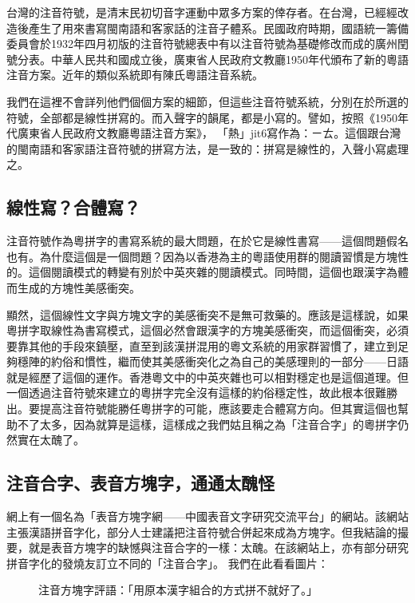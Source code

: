 \documentclass[a5paper, 12pt, openany]{book} %
\begin{document}
台灣的注音符號，是清末民初切音字運動中眾多方案的倖存者。在台灣，已經經改造後產生了用來書寫閩南語和客家話的注音子體系。民國政府時期，國語統一籌備委員會於1932年四月初版的注音符號總表中有以注音符號為基礎修改而成的廣州閏號分表。中華人民共和國成立後，廣東省人民政府文教廳1950年代頒布了新的粵語注音方案。近年的類似系統即有陳氏粵語注音系統。 

我們在這裡不會詳列他們個個方案的細節，但這些注音符號系統，分別在於所選的符號，全部都是線性拼寫的。而入聲字的韻尾，都是小寫的。譬如，按照《1950年代廣東省人民政府文教廳粵語注音方案》， 「熱」jit6寫作為：ㄧㄊ。這個跟台灣的閩南語和客家語注音符號的拼寫方法，是一致的：拼寫是線性的，入聲小寫處理之。

\subsection{線性寫？合體寫？}

注音符號作為粵拼字的書寫系統的最大問題，在於它是線性書寫——這個問題假名也有。為什麼這個是一個問題？因為以香港為主的粵語使用群的閱讀習慣是方塊性的。這個閱讀模式的轉變有別於中英夾雜的閱讀模式。同時間，這個也跟漢字為體而生成的方塊性美感衝突。

顯然，這個線性文字與方塊文字的美感衝突不是無可救藥的。應該是這樣說，如果粵拼字取線性為書寫模式，這個必然會跟漢字的方塊美感衝突，而這個衝突，必須要靠其他的手段來鎮壓，直至到該漢拼混用的粵文系統的用家群習慣了，建立到足夠穩陣的約俗和慣性，繼而使其美感衝突化之為自己的美感理則的一部分——日語就是經歷了這個的運作。香港粵文中的中英夾雜也可以相對穩定也是這個道理。但一個透過注音符號來建立的粵拼字完全沒有這樣的約俗穩定性，故此根本很難勝出。要提高注音符號能勝任粵拼字的可能，應該要走合體寫方向。但其實這個也幫助不了太多，因為就算是這樣，這樣成之我們姑且稱之為「注音合字」的粵拼字仍然實在太醜了。

\subsection{注音合字、表音方塊字，通通太醜怪}

網上有一個名為「表音方塊字網——中國表音文字研究交流平台」的網站。該網站主張漢語拼音字化，部分人士建議把注音符號合併起來成為方塊字。但我結論的撮要，就是表音方塊字的缺憾與注音合字的一樣：太醜。在該網站上，亦有部分研究拼音字化的發燒友訂立不同的「注音合字」。 我們在此看看圖片：

\begin{figure}[H]
\centering
\caption{注音方塊字評語：「用原本漢字組合的方式拼不就好了。」}
\end{figure}
\end{document}
